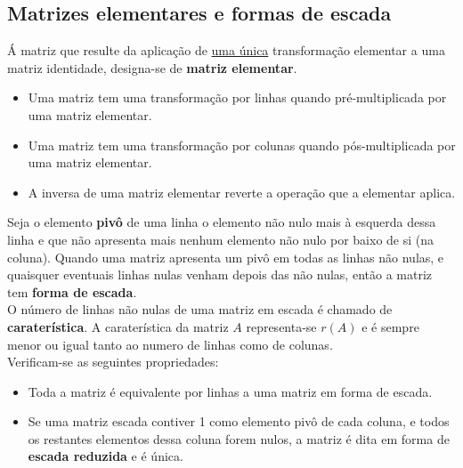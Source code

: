 \documentclass[]{report}
\begin{document}
\subsection{Matrizes elementares e formas de escada}
Á matriz que resulte da aplicação de \underline{uma única} transformação elementar a uma matriz identidade, designa-se de \textbf{matriz elementar}.
\begin{itemize}
\item Uma matriz tem uma transformação por linhas quando pré-multiplicada por uma matriz elementar.
\item Uma matriz tem uma transformação por colunas quando pós-multiplicada por uma matriz elementar.
\item A inversa de uma matriz elementar reverte a operação que a elementar aplica.
\end{itemize}
Seja o elemento \textbf{pivô} de uma linha o elemento não nulo mais à esquerda dessa linha e que não apresenta mais nenhum elemento não nulo por baixo de si (na coluna).
Quando uma matriz apresenta um pivô em todas as linhas não nulas, e quaisquer eventuais linhas nulas venham depois das não nulas, então a matriz tem \textbf{forma de escada}.\\[0.2cm]
O número de linhas não nulas de uma matriz em escada é chamado de \textbf{caraterística}.
A caraterística da matriz $A$ representa-se $r(A)$ e é sempre menor ou igual tanto ao numero de linhas como de colunas.\\[0.2cm]
Verificam-se as seguintes propriedades:
\begin{itemize}
\item Toda a matriz é equivalente por linhas a uma matriz em forma de escada.
\item Se uma matriz  escada contiver 1 como elemento pivô de cada coluna, e todos os restantes elementos dessa coluna forem nulos, a matriz é dita em forma de \textbf{escada reduzida} e é única. 
\end{itemize}
\end{document}
